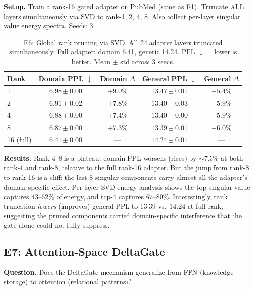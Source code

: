 \documentclass{article}
\begin{document}
\textbf{Setup.} Train a rank-16 gated adapter on PubMed (same as E1).
Truncate ALL layers simultaneously via SVD to rank-1, 2, 4, 8.
Also collect per-layer singular value energy spectra. Seeds: 3.


\begin{table}[h]
\centering
\caption{E6: Global rank pruning via SVD. All 24 adapter layers
truncated simultaneously. Full adapter: domain 6.41, generic 14.24.
PPL $\downarrow$ = lower is better.
Mean $\pm$ std across 3 seeds.}
\label{tab:e6}
\begin{tabular}{@{}lcccc@{}}
\toprule
Rank & Domain PPL $\downarrow$ & Domain $\Delta$ & General PPL $\downarrow$ & General $\Delta$ \\
\midrule
1  & $6.98{\pm}0.00$ & $+9.0\%$  & $13.47{\pm}0.01$ & $-5.4\%$ \\
2  & $6.91{\pm}0.02$ & $+7.8\%$  & $13.40{\pm}0.03$ & $-5.9\%$ \\
4  & $6.88{\pm}0.00$ & $+7.4\%$  & $13.40{\pm}0.00$ & $-5.9\%$ \\
8  & $6.87{\pm}0.00$ & $+7.3\%$  & $13.39{\pm}0.01$ & $-6.0\%$ \\
16 (full) & $6.41{\pm}0.00$ & --- & $14.24{\pm}0.01$ & --- \\
\bottomrule
\end{tabular}
\end{table}

\textbf{Results.} Rank 4--8 is a plateau: domain PPL worsens (rises)
by ${\sim}7.3\%$ at both rank-4 and rank-8, relative to the full
rank-16 adapter. But the jump from rank-8 to rank-16 is a cliff:
the last 8 singular components carry almost all the adapter's
domain-specific effect.  Per-layer SVD energy analysis shows the top
singular value captures $43$--$62\%$ of energy, and top-4 captures
$67$--$80\%$.  Interestingly, rank truncation \emph{lowers} (improves)
general PPL to $13.39$ vs.\ $14.24$ at full rank, suggesting the
pruned components carried domain-specific interference that the gate
alone could not fully suppress.

\subsection{E7: Attention-Space DeltaGate}
\label{sec:e7}

\textbf{Question.} Does the DeltaGate mechanism generalize from FFN
(knowledge storage) to attention (relational patterns)?
\end{document}

